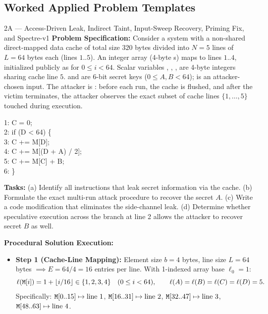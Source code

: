 \subsection{Worked Applied Problem Templates}

\begin{templatebox}{2A --- Access-Driven Leak, Indirect Taint, Input-Sweep Recovery, Priming Fix, and Spectre-v1}
\textbf{Problem Specification:} Consider a system with a non-shared direct-mapped data cache of total size $320$ bytes divided into $N = 5$ lines of $L = 64$ bytes each (lines $1..5$). An integer array  (4-byte s) maps to lines $1..4$, initialized publicly as  for $0 \le i < 64$. Scalar variables , , ,  are 4-byte integers sharing cache line $5$.  and  are 6-bit secret keys ($0 \le A, B < 64$);  is an attacker-chosen input. The attacker is : before each run, the cache is flushed, and after the victim terminates, the attacker observes the exact subset of cache lines $\{1,\dots,5\}$ touched during execution.
\begin{codeblock}
1: C = 0;\\
2: if (D < 64) \{\\
3: \hspace*{1.5em} C += M[D];\\
4: \hspace*{1.5em} C += M[(D + A) / 2];\\
5: \hspace*{1.5em} C += M[C] + B;\\
6: \}
\end{codeblock}
\textbf{Tasks:} (a) Identify all instructions that leak secret information via the cache. (b) Formulate the exact multi-run attack procedure to recover the secret $A$. (c) Write a code modification that eliminates the side-channel leak. (d) Determine whether speculative execution across the branch at line 2 allows the attacker to recover secret $B$ as well.

\medskip
\textbf{Procedural Solution Execution:}
\begin{itemize}
  \item \textbf{Step 1 (Cache-Line Mapping):} Element size $b = 4$ bytes, line size $L = 64$ bytes $\implies E = 64/4 = 16$ entries per line. With 1-indexed array base $\ell_0 = 1$:
  \[
    \ell(\texttt{M}[i]) = 1 + \lfloor i / 16 \rfloor \in \{1, 2, 3, 4\} \quad (0 \le i < 64), \qquad \ell(A) = \ell(B) = \ell(C) = \ell(D) = 5.
  \]
  Specifically: $\texttt{M}[0..15] \mapsto \text{line } 1$, $\texttt{M}[16..31] \mapsto \text{line } 2$, $\texttt{M}[32..47] \mapsto \text{line } 3$, $\texttt{M}[48..63] \mapsto \text{line } 4$.


\end{itemize}
\end{templatebox}
